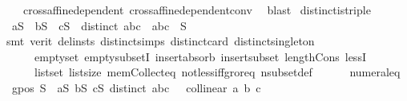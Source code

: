 \begin{isabellebody}
\ \ \ \ cross{\isacharunderscore}{\kern0pt}affine{\isacharunderscore}{\kern0pt}dependent\ cross{\isacharunderscore}{\kern0pt}affine{\isacharunderscore}{\kern0pt}dependent{\isacharunderscore}{\kern0pt}conv\ \isamarkupfalse%
\ blast%
\endisatagproof
{\isafoldproof}%
%
\isadelimproof
\isanewline
%
\endisadelimproof
\isanewline
{}\isamarkupfalse%
\ distinct{\isacharunderscore}{\kern0pt}is{\isacharunderscore}{\kern0pt}triple{\isacharcolon}{\kern0pt}\isanewline
\ \ {\isachardoublequoteopen}a{\isasymin}S\ {\isasymand}\ b{\isasymin}S\ {\isasymand}\ c{\isasymin}S\ {\isasymand}\ distinct\ {\isacharbrackleft}{\kern0pt}a{\isacharcomma}{\kern0pt}b{\isacharcomma}{\kern0pt}c{\isacharbrackright}{\kern0pt}\ {\isasymlongleftrightarrow}\ {\isacharbraceleft}{\kern0pt}a{\isacharcomma}{\kern0pt}b{\isacharcomma}{\kern0pt}c{\isacharbraceright}{\kern0pt}\ {\isasymin}\ S\ {\isachartilde}{\kern0pt}\ {}{\isachardoublequoteclose}\isanewline
%
\isadelimproof
\ \ %
\endisadelimproof
%
\isatagproof
{}\isamarkupfalse%
\ {\isacharparenleft}{\kern0pt}smt\ {\isacharparenleft}{\kern0pt}verit{\isacharcomma}{\kern0pt}\ del{\isacharunderscore}{\kern0pt}insts{\isacharparenright}{\kern0pt}\ distinct{\isachardot}{\kern0pt}simps{\isacharparenleft}{\kern0pt}{}{\isacharparenright}{\kern0pt}\ distinct{\isacharunderscore}{\kern0pt}card\ distinct{\isacharunderscore}{\kern0pt}singleton\isanewline
\ \ \ \ \ \ empty{\isacharunderscore}{\kern0pt}set\ empty{\isacharunderscore}{\kern0pt}subsetI\ insert{\isacharunderscore}{\kern0pt}absorb\ insert{\isacharunderscore}{\kern0pt}subset\ length{\isacharunderscore}{\kern0pt}Cons\ lessI\isanewline
\ \ \ \ \ \ list{\isachardot}{\kern0pt}set{\isacharparenleft}{\kern0pt}{}{\isacharparenright}{\kern0pt}\ list{\isachardot}{\kern0pt}size{\isacharparenleft}{\kern0pt}{}{\isacharparenright}{\kern0pt}\ mem{\isacharunderscore}{\kern0pt}Collect{\isacharunderscore}{\kern0pt}eq\ not{\isacharunderscore}{\kern0pt}less{\isacharunderscore}{\kern0pt}iff{\isacharunderscore}{\kern0pt}gr{\isacharunderscore}{\kern0pt}or{\isacharunderscore}{\kern0pt}eq\ nsubset{\isacharunderscore}{\kern0pt}def\isanewline
\ \ \ \ \ \ numeral{\isacharunderscore}{\kern0pt}{}{\isacharunderscore}{\kern0pt}eq{\isacharunderscore}{\kern0pt}{}{\isacharparenright}{\kern0pt}%
\endisatagproof
{\isafoldproof}%
%
\isadelimproof
\isanewline
%
\endisadelimproof
\isanewline
\isanewline
{}\isamarkupfalse%
\isanewline
\ \ {\isachardoublequoteopen}gpos\ S\ {\isasymequiv}\ {\isasymforall}a{\isasymin}S{\isachardot}{\kern0pt}\ {\isasymforall}b{\isasymin}S{\isachardot}{\kern0pt}\ {\isasymforall}c{\isasymin}S{\isachardot}{\kern0pt}\ distinct\ {\isacharbrackleft}{\kern0pt}a{\isacharcomma}{\kern0pt}b{\isacharcomma}{\kern0pt}c{\isacharbrackright}{\kern0pt}\ {\isasymlongrightarrow}\ {\isasymnot}\ collinear{}\ a\ b\ c{\isachardoublequoteclose}\isanewline

\end{isabellebody}
